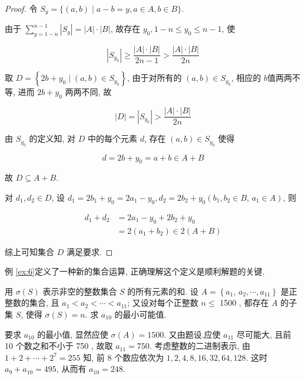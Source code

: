 \begin{proof}
令 $S_{y}=\{(a, b) \mid a-b=y, a \in A, b \in B\}$.

由于 $\sum_{y=1-n}^{n-1}\left|S_{y}\right|=|A| \cdot|B|$, 故存在 $y_{0}, 1-n \leqslant y_{0} \leqslant n-1$, 使

$$
\left|S_{y_{0}}\right| \geqslant \frac{|A| \cdot|B|}{2 n-1}>\frac{|A| \cdot|B|}{2 n}
$$

取 $D=\left\{2 b+y_{0} \mid(a, b) \in S_{y_{0}}\right\}$, 由于对所有的 $(a, b) \in S_{y_{0}}$, 相应的 $b$值两两不等, 进而 $2 b+y_{0}$ 两两不同, 故

$$
|D|=\left|S_{y_{0}}\right|>\frac{|A| \cdot|B|}{2 n}
$$

由 $S_{y_{0}}$ 的定义知, 对 $D$ 中的每个元素 $d$, 存在 $(a, b) \in S_{y_{0}}$ 使得

$$
d=2 b+y_{0}=a+b \in A+B
$$

故 $D \subseteq A+B$.

对 $d_{1}, d_{2} \in D$, 设 $d_{1}=2 b_{1}+y_{0}=2 a_{1}-y_{0}, d_{2}=2 b_{2}+y_{0}\left(b_{1}, b_{2} \in B\right.$, $\left.a_{1} \in A\right)$, 则

$$
\begin{aligned}
d_{1}+d_{2} & =2 a_{1}-y_{0}+2 b_{2}+y_{0} \\
& =2\left(a_{1}+b_{2}\right) \in 2(A+B)
\end{aligned}
$$

综上可知集合 $D$ 满足要求.
\end{proof}

\begin{note}
例 \ref{ex:6}定义了一种新的集合运算, 正确理解这个定义是顺利解题的关键.
\end{note}

\begin{example}
用 $\sigma(S)$ 表示非空的整数集合 $S$ 的所有元素的和. 设 $A=\left\{a_{1}\right.$, $\left.a_{2}, \cdots, a_{11}\right\}$ 是正整数的集合, 且 $a_{1}<a_{2}<\cdots<a_{11}$; 又设对每个正整数 $n \leqslant$ 1500 , 都存在 $A$ 的子集 $S$, 使得 $\sigma(S)=n$. 求 $a_{10}$ 的最小可能值.
\end{example}

\begin{analysis}
要求 $a_{10}$ 的最小值, 显然应使 $\sigma(A)=1500$. 又由题设,应使 $a_{11}$ 尽可能大, 且前 10 个数之和不小于 750 , 故取 $a_{11}=750$. 考虑整数的二进制表示, 由 $1+2+\cdots+2^{7}=255$ 知, 前 8 个数应依次为 $1 ,  2 ,  4 ,  8 ,  16 ,  32 ,  64 ,  128$. 这时 $a_{9}+a_{10}=495$, 从而有 $a_{10}=248$.
\end{analysis}

